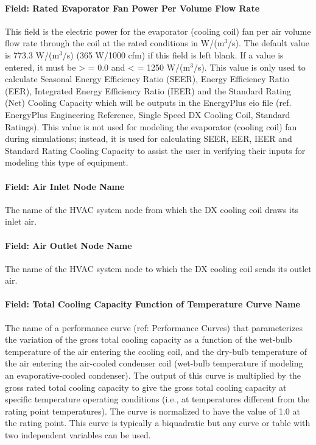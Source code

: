 \paragraph{Field: Rated Evaporator Fan Power Per Volume Flow Rate}\label{field-rated-evaporator-fan-power-per-volume-flow-rate}

This field is the electric power for the evaporator (cooling coil) fan per air volume flow rate through the coil at the rated conditions in W/(m\(^{3}\)/s). The default value is 773.3 W/(m\(^{3}\)/s) (365 W/1000 cfm) if this field is left blank. If a value is entered, it must be \textgreater{} = 0.0 and \textless{} = 1250 W/(m\(^{3}\)/s). This value is only used to calculate Seasonal Energy Efficiency Ratio (SEER), Energy Efficiency Ratio (EER), Integrated Energy Efficiency Ratio (IEER) and the Standard Rating (Net) Cooling Capacity which will be outputs in the EnergyPlus eio file (ref. EnergyPlus Engineering Reference, Single Speed DX Cooling Coil, Standard Ratings). This value is not used for modeling the evaporator (cooling coil) fan during simulations; instead, it is used for calculating SEER, EER, IEER and Standard Rating Cooling Capacity to assist the user in verifying their inputs for modeling this type of equipment.

\paragraph{Field: Air Inlet Node Name}\label{field-air-inlet-node-name-9}

The name of the HVAC system node from which the DX cooling coil draws its inlet air.

\paragraph{Field: Air Outlet Node Name}\label{field-air-outlet-node-name-9-000}

The name of the HVAC system node to which the DX cooling coil sends its outlet air.

\paragraph{Field: Total Cooling Capacity Function of Temperature Curve Name}\label{field-total-cooling-capacity-function-of-temperature-curve-name}

The name of a performance curve (ref: Performance Curves) that parameterizes the variation of the gross total cooling capacity as a function of the wet-bulb temperature of the air entering the cooling coil, and the dry-bulb temperature of the air entering the air-cooled condenser coil (wet-bulb temperature if modeling an evaporative-cooled condenser). The output of this curve is multiplied by the gross rated total cooling capacity to give the gross total cooling capacity at specific temperature operating conditions (i.e., at temperatures different from the rating point temperatures). The curve is normalized to have the value of 1.0 at the rating point. This curve is typically a biquadratic but any curve or table with two independent variables can be used.

